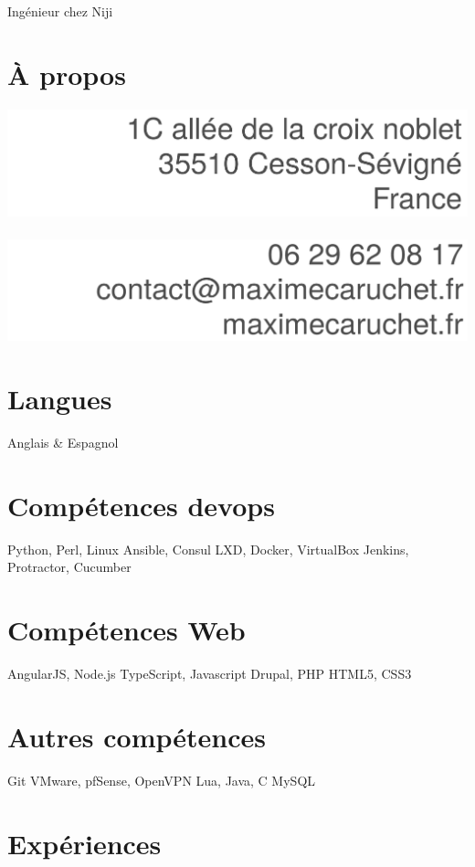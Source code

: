 \documentclass[]{friggeri-cv}
\begin{document}
       {Ingénieur chez Niji}


\begin{aside}
  \section{À propos}
    \includegraphics[width=\textwidth]{personal_details}
    ~
    \includegraphics[width=\textwidth]{personal_details3}
  \section{Langues}
    Anglais \& Espagnol
  \section{Compétences devops}
    Python, Perl, Linux
    Ansible, Consul
    LXD, Docker, VirtualBox
    Jenkins, Protractor, Cucumber
  \section{Compétences Web}
    AngularJS, Node.js
    TypeScript, Javascript
    Drupal, PHP
    HTML5, CSS3
  \section{Autres compétences}
    Git
    VMware, pfSense, OpenVPN
    Lua, Java, C
    MySQL
\end{aside}

\section{Expériences}
\end{document}
